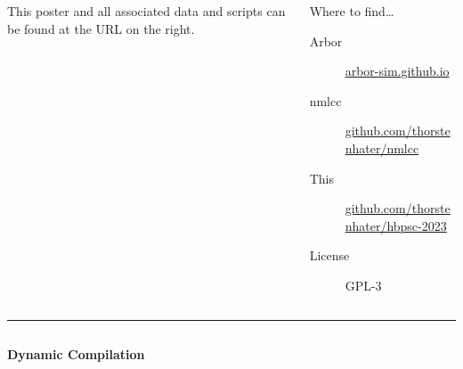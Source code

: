 \documentclass{beamer}
\begin{document}
\begin{frame}[t, fragile]
\begin{columns}[onlytextwidth,T]
\begin{column}{0.76\textwidth}
      This poster and all associated data and scripts can be found at the URL on
      the right.
    \end{column}
    \begin{column}{0.22\textwidth}
      \vspace*{-1ex}
      \begin{block}{Where to find\dots}
        \begin{description}
          \item[Arbor] \href{https://arbor-sim.github.io}{arbor-sim.github.io}
          \item[nmlcc] \href{https://github.com/thorstenhater/nmlcc}{github.com/thorstenhater/nmlcc}
          \item[This] \href{https://github.com/thorstenhater/nmlcc}{github.com/thorstenhater/hbpsc-2023}
          \item[License] GPL-3
        \end{description}
      \end{block}
    \end{column}
  \end{columns}
  \vspace*{1ex}
  \textcolor{arbgrey}{\rule{\textwidth}{0.5ex}}
  \vspace*{-1ex}
  \begin{columns}
    \begin{column}{0.55\textwidth}
      \textbf{Dynamic Compilation}


\end{column}
\end{columns}
\end{frame}
\end{document}
